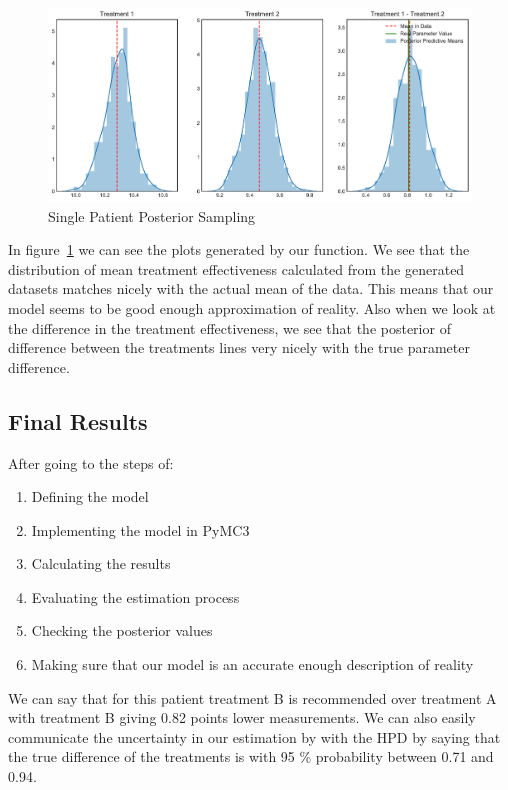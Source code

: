 \documentclass[12pt,a4paper,leqno]{report}
\theoremstyle{plain}
\theoremstyle{definition}
\theoremstyle{remark}
\begin{document}
\bigskip
\begin{figure}[H]
    \caption{Single Patient Posterior Sampling}
    \label{singlepatientposteriorsampling}
    \bigskip
    \includegraphics[width=\textwidth,height=\textheight,keepaspectratio]{single_patient_posterior_sampling.pdf}
\end{figure}
\bigskip

In figure\ \ref{singlepatientposteriorsampling} we can see the plots generated by our function. 
We see that the distribution of mean treatment effectiveness calculated from the
generated datasets matches nicely with the actual mean of the data. This means that our
model seems to be good enough approximation of reality. Also when we look at the difference in the treatment effectiveness,
we see that the posterior of difference between the treatments lines very nicely with the
true parameter difference.

\subsection{Final Results}

After going to the steps of:

\begin{enumerate}
    \item Defining the model
    \item Implementing the model in PyMC3
    \item Calculating the results
    \item Evaluating the estimation process
    \item Checking the posterior values
    \item Making sure that our model is an accurate enough description of reality
\end{enumerate}

We can say that for this patient treatment B is recommended over treatment A with
treatment B giving 0.82 points lower measurements. We can also easily communicate
the uncertainty in our estimation by with the HPD by saying that the true difference of
the treatments is with 95 \% probability between 0.71 and 0.94. 
\end{document}
